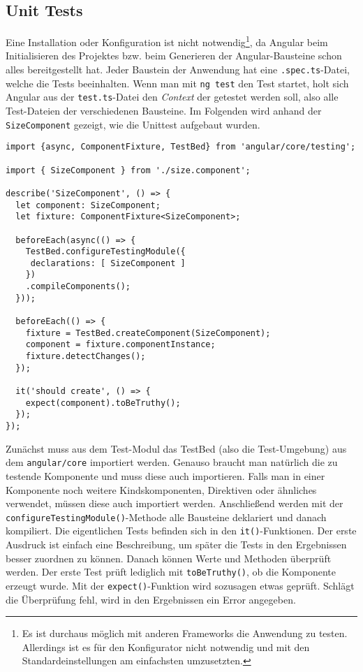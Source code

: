 \subsection{Unit Tests}
Eine Installation oder Konfiguration ist nicht notwendig\footnote{Es ist durchaus möglich mit anderen Frameworks die Anwendung zu testen. Allerdings ist es für den Konfigurator nicht notwendig und mit den Standardeinstellungen am einfachsten umzusetzten.}, da Angular beim Initialisieren des Projektes bzw. beim Generieren der Angular-Bausteine schon alles bereitgestellt hat. Jeder Baustein der Anwendung hat eine \texttt{.spec.ts}-Datei, welche die Tests beeinhalten. Wenn man mit \texttt{ng test} den Test startet, holt sich Angular aus der \texttt{test.ts}-Datei den \textit{Context} der getestet werden soll, also alle Test-Dateien der verschiedenen Bausteine. Im Folgenden wird anhand der \texttt{SizeComponent} gezeigt, wie die Unittest aufgebaut wurden.
%
\begin{lstlisting}[caption={size.component.spec.ts Datei},label=lst:unittest]
import {async, ComponentFixture, TestBed} from 'angular/core/testing';

import { SizeComponent } from './size.component';

describe('SizeComponent', () => {
  let component: SizeComponent;
  let fixture: ComponentFixture<SizeComponent>;

  beforeEach(async(() => {
	TestBed.configureTestingModule({
	 declarations: [ SizeComponent ]
	})
    .compileComponents();
  }));

  beforeEach(() => {
	fixture = TestBed.createComponent(SizeComponent);
	component = fixture.componentInstance;
	fixture.detectChanges();
  });

  it('should create', () => {
	expect(component).toBeTruthy();
  });
});
\end{lstlisting}
%
Zunächst muss aus dem Test-Modul das TestBed (also die Test-Umgebung) aus dem \texttt{angular/core} importiert werden. Genauso braucht man natürlich die zu testende Komponente und muss diese auch importieren. Falls man in einer Komponente noch weitere Kindskomponenten, Direktiven oder ähnliches verwendet, müssen diese auch importiert werden. Anschließend werden mit der \texttt{configureTestingModule()}-Methode alle Bausteine deklariert und danach kompiliert. Die eigentlichen Tests befinden sich in den \texttt{it()}-Funktionen. Der erste Ausdruck ist einfach eine Beschreibung, um später die Tests in den Ergebnissen besser zuordnen zu können. Danach können Werte und Methoden überprüft werden. Der erste Test prüft lediglich mit \texttt{toBeTruthy()}, ob die Komponente erzeugt wurde. Mit der \texttt{expect()}-Funktion wird sozusagen etwas geprüft. Schlägt die Überprüfung fehl, wird in den Ergebnissen ein Error angegeben.
